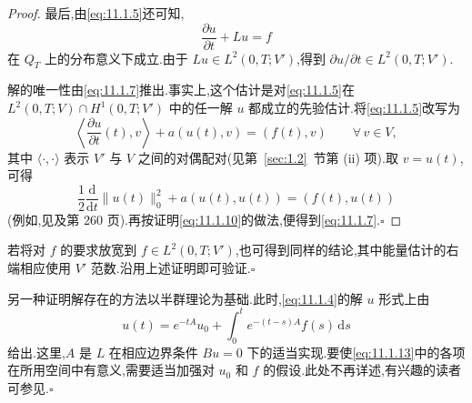 \begin{proof}
最后,由\eqref{eq:11.1.5}还可知,
\begin{equation}\label{eq:11.1.12}
  \frac{\partial u}{\partial t}+Lu=f
\end{equation}
在 \(Q_T\) 上的分布意义下成立.由于 \(Lu\in L^2(0,T;V')\),得到 \(\partial u/\partial t\in L^2(0,T;V')\).

解的唯一性由\eqref{eq:11.1.7}推出.事实上,这个估计是对\eqref{eq:11.1.5}在 \(L^2(0,T;V)\cap H^1(0,T;V')\) 中的任一解 \(u\) 都成立的先验估计.将\eqref{eq:11.1.5}改写为
\[
  \left\langle\frac{\partial u}{\partial t}(t),v\right\rangle
       +a(u(t),v)=(f(t),v)\qquad\forall\,v\in V,
\]
其中 \(\langle\cdot,\cdot\rangle\) 表示 \(V'\) 与 \(V\) 之间的对偶配对(见第~\ref{sec:1.2}~节第 (ii) 项).取 \(v=u(t)\),可得
\[
  \frac12\frac{\mathrm d}{\mathrm dt}\|u(t)\|_0^2+a(u(t),u(t))=(f(t),u(t))
\]
(例如,见及第 260 页).再按证明\eqref{eq:11.1.10}的做法,便得到\eqref{eq:11.1.7}.\hfill\(\square\)
\end{proof}

\begin{note}
若将对 \(f\) 的要求放宽到 \(f\in L^2(0,T;V')\),也可得到同样的结论,其中能量估计的右端相应使用 \(V'\) 范数.沿用上述证明即可验证.\hfill\(\square\)
\end{note}

\begin{note}
另一种证明解存在的方法以半群理论为基础.此时,\eqref{eq:11.1.4}的解 \(u\) 形式上由
\begin{equation}\label{eq:11.1.13}
  u(t)=e^{-tA}u_0+\int_0^t e^{-(t-s)A}f(s)\,\mathrm ds
\end{equation}
给出.这里,\(A\) 是 \(L\) 在相应边界条件 \(Bu=0\) 下的适当实现.要使\eqref{eq:11.1.13}中的各项在所用空间中有意义,需要适当加强对 \(u_0\) 和 \(f\) 的假设.此处不再详述,有兴趣的读者可参见.\hfill\(\square\)
\end{note}

